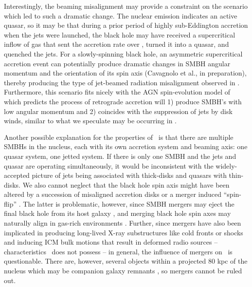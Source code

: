 \documentclass[useAMS,usenatbib]{mn2e}
\begin{document}
Interestingly, the beaming misalignment may provide a constraint on
the scenario which led to such a dramatic change. The nuclear emission
indicates an active quasar, so it may be that during a prior period of
highly sub-Eddington accretion when the jets were launched, the black
hole may have received a supercritical inflow of gas \citep[a
  hypothesized fueling mechanism for high-redshift quasars,
  \eg][]{2005ApJ...633..624V} that sent the accretion rate over
\dmcrit, turned it into a quasar, and quenched the jets. For a
slowly-spinning black hole, an asymmetric supercritical accretion
event can potentially produce dramatic changes in SMBH angular
momentum and the orientation of its spin axis (Cavagnolo et al., in
preparation), thereby producing the type of jet-beamed radiation
misalignment observed in \irs. Furthermore, this scenario fits nicely
with the AGN spin-evolution model of \citet{gesspin} which predicts
the process of retrograde accretion will 1) produce SMBH's with low
angular momentum and 2) coincides with the suppression of jets by disk
winds, similar to what we speculate may be occurring in \irs.

Another possible explanation for the properties of \irs\ is that there
are multiple SMBHs in the nucleus, each with its own accretion system
and beaming axis: one quasar system, one jetted system. If there is
only one SMBH and the jets and quasar are operating simultaneously, it
would be inconsistent with the widely-accepted picture of jets being
associated with thick-disks and quasars with thin-disks. We also
cannot neglect that the black hole spin axis might have been altered
by a succession of misaligned accretion disks
\citep[\eg][]{2005MNRAS.363...49K} or a merger induced ``spin-flip''
\citep{2002Sci...297.1310M}. The latter is problematic, however, since
SMBH mergers may eject the final black hole from its host galaxy
\citep[\eg][]{2007ApJ...659L...5C}, and merging black hole spin axes
may naturally align in gas-rich environments
\citep{2007ApJ...661L.147B}. Further, since mergers have also been
implicated in producing long-lived X-ray substructures like cold
fronts or shocks \citep{2007PhR...443....1M} and inducing ICM bulk
motions that result in deformed radio sources
\citep{2009A&A...495..721S} -- characteristics \irs\ does not possess
-- in general, the influence of mergers on \irs\ is
questionable. There are, however, several objects within a projected
80 kpc of the nucleus which may be companion galaxy remnants
\citep{1996AJ....111..649S, 1999Ap&SS.266..113A}, so mergers cannot be
ruled out.
\end{document}
